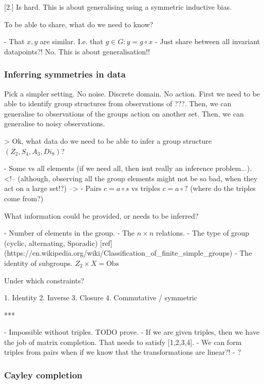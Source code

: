 [2.] Is hard. This is about generalising using a symmetric inductive bias.

To be able to share, what do we need to know?

- That $x, y$ are similar. I.e. that $g \in G: y = g\circ x$
- Just share between all invariant datapoints?! No. This is about generalisation!!

\subsubsection{Inferring symmetries in data}

Pick a simpler setting. No noise. Discrete domain. No action.
First we need to be able to identify group structures from observations of ???.
Then, we can generalise to observations of the groups action on another set.
Then, we can generalise to noisy observations.


> Ok, what data do we need to be able to infer a group structure $(Z_2, S_4, A_3, Di_8)$?

- Some vs all elements (if we need all, then isnt really an inference problem...).
<!-- (although, observing all the group elements might not be so bad, when they act on a large set!?) -->
- Pairs $c = a \circ s$ vs triples $c = a \circ ?$ (where do the triples come from?)

What information could be provided, or needs to be inferred?

- Number of elements in the group.
- The $n\times n$ relations.
- The type of group (cyclic, alternating, Sporadic) [ref](https://en.wikipedia.org/wiki/Classification_of_finite_simple_groups)
- The identity of subgroups. $Z_2 \times X = \text{Obs}$

Under which constraints?

1. Identity
2. Inverse
3. Closure
4. Commutative / symmetric

***

- Impossible without triples. TODO prove.
- If we are given triples, then we have the job of matrix completion. That needs to satisfy [1,2,3,4].
- We can form triples from pairs when if we know that the transformations are linear?!
- ?

\subsubsection{Cayley completion}

